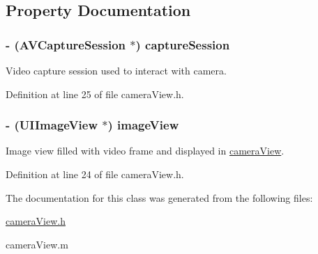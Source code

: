 \subsection{Property Documentation}
\hypertarget{interfacecamera_view_a6325249b12975d12ea28b956b46fae62}{
\subsubsection[{captureSession}]{\setlength{\rightskip}{0pt plus 5cm}-\/ (AVCaptureSession $\ast$) captureSession}}
\label{interfacecamera_view_a6325249b12975d12ea28b956b46fae62}
Video capture session used to interact with camera. 

Definition at line 25 of file cameraView.h.

\hypertarget{interfacecamera_view_a636153a51fbba10a8c14fb52b1f184a6}{
\subsubsection[{imageView}]{\setlength{\rightskip}{0pt plus 5cm}-\/ (UIImageView $\ast$) imageView}}
\label{interfacecamera_view_a636153a51fbba10a8c14fb52b1f184a6}
Image view filled with video frame and displayed in \hyperlink{interfacecamera_view}{cameraView}. 

Definition at line 24 of file cameraView.h.



The documentation for this class was generated from the following files:\begin{DoxyCompactItemize}
\item 
\hyperlink{camera_view_8h}{cameraView.h}\item 
cameraView.m\end{DoxyCompactItemize}

